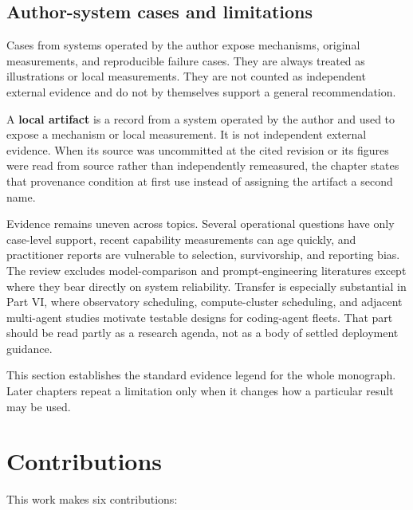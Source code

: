 \hypertarget{author-system-cases-and-limitations}{%
\subsection{Author-system cases and limitations}\label{author-system-cases-and-limitations}}

Cases from systems operated by the author expose mechanisms, original measurements, and reproducible failure cases. They are always treated as illustrations or local measurements. They are not counted as independent external evidence and do not by themselves support a general recommendation.

A \textbf{local artifact} is a record from a system operated by the author and used to expose a mechanism or local measurement. It is not independent external evidence. When its source was uncommitted at the cited revision or its figures were read from source rather than independently remeasured, the chapter states that provenance condition at first use instead of assigning the artifact a second name.

Evidence remains uneven across topics. Several operational questions have only case-level support, recent capability measurements can age quickly, and practitioner reports are vulnerable to selection, survivorship, and reporting bias. The review excludes model-comparison and prompt-engineering literatures except where they bear directly on system reliability. Transfer is especially substantial in Part VI, where observatory scheduling, compute-cluster scheduling, and adjacent multi-agent studies motivate testable designs for coding-agent fleets. That part should be read partly as a research agenda, not as a body of settled deployment guidance.

This section establishes the standard evidence legend for the whole monograph. Later chapters repeat a limitation only when it changes how a particular result may be used.

\hypertarget{contributions}{%
\section{Contributions}\label{contributions}}


This work makes six contributions:

